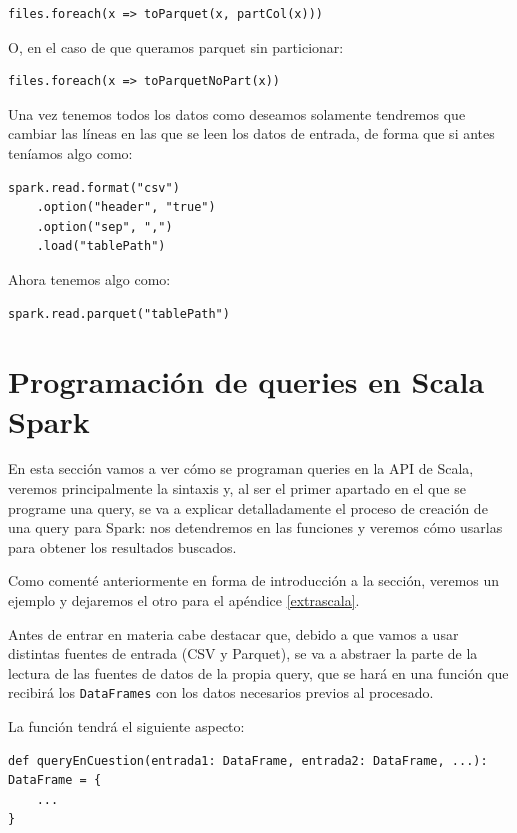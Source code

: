 \documentclass[12pt,twoside,titlepage]{report}
\begin{document}
\begin{lstlisting}
files.foreach(x => toParquet(x, partCol(x)))
\end{lstlisting}

O, en el caso de que queramos parquet sin particionar:

\begin{lstlisting}
files.foreach(x => toParquetNoPart(x))
\end{lstlisting}

Una vez tenemos todos los datos como deseamos solamente tendremos que cambiar las líneas en las que se leen los datos de entrada, de forma que si antes teníamos algo como:

\begin{lstlisting}
spark.read.format("csv")
	.option("header", "true")
	.option("sep", ",")
	.load("tablePath")
\end{lstlisting}

Ahora tenemos algo como:

\begin{lstlisting}
spark.read.parquet("tablePath")
\end{lstlisting}


\section{Programación de queries en Scala Spark}

En esta sección vamos a ver cómo se programan queries en la API de Scala, veremos principalmente la sintaxis y, al ser el primer apartado en el que se programe una query, se va a explicar detalladamente el proceso de creación de una query para Spark: nos detendremos en las funciones y veremos cómo usarlas para obtener los resultados buscados.

Como comenté anteriormente en forma de introducción a la sección, veremos un ejemplo y dejaremos el otro para el apéndice \ref{extrascala}.

Antes de entrar en materia cabe destacar que, debido a que vamos a usar distintas fuentes de entrada (CSV y Parquet), se va a abstraer la parte de la lectura de las fuentes de datos de la propia query, que se hará en una función que recibirá los \texttt{DataFrames} con los datos necesarios previos al procesado.

La función tendrá el siguiente aspecto:

\begin{lstlisting}
def queryEnCuestion(entrada1: DataFrame, entrada2: DataFrame, ...): DataFrame = {
	...
}
\end{lstlisting}
\end{document}
